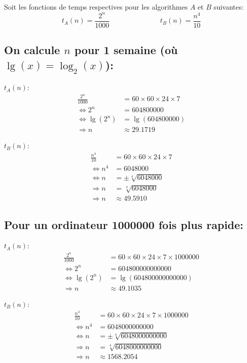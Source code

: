 \documentclass{article}
\begin{document}
\pagebreak

\section{}
Soit les fonctions de temps respectives pour les algorithmes $A$ et $B$ suivantes:
$$
t_A(n)=\frac{2^n}{1000}
\hspace{3cm}
t_B(n)=\frac{n^4}{10}
$$

\subsection{On calcule $n$ pour 1 semaine (où $\lg(x) = \log_2(x)$):}

$t_A(n)$:
$$
\begin{aligned}
  \frac{2^n}{1000} &= 60 \times 60 \times 24 \times 7 \\
  \Leftrightarrow 2^n &= \num{604800000} \\
  \Leftrightarrow \lg(2^n) &= \lg(\num{604800000}) \\
  \Rightarrow n &\approx 29.1719
\end{aligned}
$$

$t_B(n)$:
$$
\begin{aligned}
  \frac{n^4}{10} &= 60 \times 60 \times 24 \times 7 \\
  \Leftrightarrow n^4 &= \num{6048000} \\
  \Leftrightarrow n &= \pm \sqrt[4]{\num{6048000}} \\
  \Rightarrow n &= \sqrt[4]{\num{6048000}} \\
  \Rightarrow n &\approx 49.5910
\end{aligned}
$$

\subsection{Pour un ordinateur \num{1000000} fois plus rapide:}

$t_A(n)$:
$$
\begin{aligned}
  \frac{2^n}{1000} &= 60 \times 60 \times 24 \times 7 \times \num{1000000}\\
  \Leftrightarrow 2^n &= \num{604800000000000} \\
  \Leftrightarrow \lg(2^n) &= \lg(\num{604800000000000}) \\
  \Rightarrow n &\approx 49.1035
\end{aligned}
$$

$t_B(n)$:
$$
\begin{aligned}
  \frac{n^4}{10} &= 60 \times 60 \times 24 \times 7 \times \num{1000000}\\
  \Leftrightarrow n^4 &= \num{6048000000000} \\
  \Leftrightarrow n &= \pm \sqrt[4]{\num{6048000000000}} \\
  \Rightarrow n &= \sqrt[4]{\num{6048000000000}} \\
  \Rightarrow n &\approx 1568.2054
\end{aligned}
$$
\end{document}
